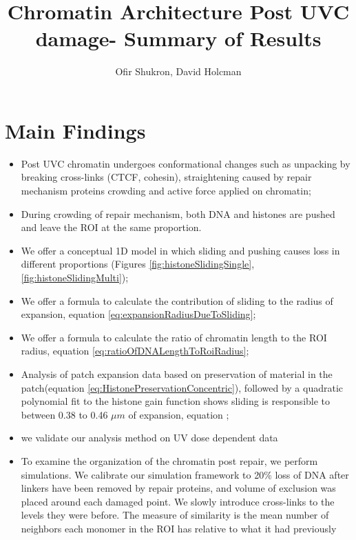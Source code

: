 \documentclass[12pt]{report}
\begin{document}
		\title{Chromatin Architecture Post UVC damage- Summary of Results}	
		\author{Ofir Shukron, David Holcman}	
		\maketitle
	\section{Main Findings}\label{section:MainFindings}
		\begin{itemize}
			\item Post UVC chromatin undergoes conformational changes such as unpacking by breaking cross-links (CTCF, cohesin), straightening caused by repair mechanism proteins crowding and active force applied on chromatin;
			\item During crowding of repair mechanism, both DNA and histones are pushed and leave the ROI at the same proportion. 
            \item We offer a conceptual 1D model in which sliding and pushing causes loss in different proportions (Figures \ref{fig:histoneSlidingSingle}, \ref{fig:histoneSlidingMulti});
			\item We offer a formula to calculate the contribution of sliding to the radius of expansion, equation \ref{eq:expansionRadiusDueToSliding};			
			\item We offer a formula to calculate the ratio of chromatin length to the ROI radius, equation \ref{eq:ratioOfDNALengthToRoiRadius};
			\item Analysis of patch expansion data based on preservation of material in the patch(equation \ref{eq:HistonePreservationConcentric}), followed by a quadratic polynomial fit to the histone gain function shows sliding is responsible to between 0.38 to 0.46 $\mu m$ of expansion, equation ;
			\item  we validate our analysis method on UV dose dependent data
			\item To examine the organization of the  chromatin post repair, we perform simulations. We calibrate our simulation framework to 20\% loss of DNA after linkers have been removed by repair proteins, and volume of exclusion was placed around each damaged point. We slowly introduce cross-links to the levels they were before. 
			The measure of similarity is the mean number of neighbors each monomer in the ROI has relative to what it had previously
			
		\end{itemize}
		
\end{document}

